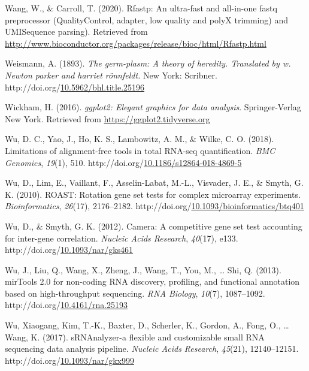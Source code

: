 \documentclass[12pt,twoside]{reedthesis}
\newlength{\cslhangindent}
\newenvironment{CSLReferences}[2] %
 {%
  \setlength{\parindent}{0pt}
  \ifodd #1 \everypar{\setlength{\hangindent}{\cslhangindent}}\ignorespaces\fi
  \ifnum #2 > 0
  \setlength{\parskip}{#2\baselineskip}
  \fi
 }%
 {}
\begin{document}
\begin{CSLReferences}{1}{0}
\leavevmode{}%
Wang, W., \& Carroll, T. (2020). Rfastp: An ultra-fast and all-in-one fastq preprocessor (QualityControl, adapter, low quality and polyX trimming) and UMISequence parsing). Retrieved from \url{http://www.bioconductor.org/packages/release/bioc/html/Rfastp.html}

\leavevmode{}%
Weismann, A. (1893). \emph{The germ-plasm: A theory of heredity. Translated by w. Newton parker and harriet rönnfeldt.} New York: Scribner. http://doi.org/\href{https://doi.org/10.5962/bhl.title.25196}{10.5962/bhl.title.25196}

\leavevmode{}%
Wickham, H. (2016). \emph{ggplot2: Elegant graphics for data analysis}. Springer-Verlag New York. Retrieved from \url{https://ggplot2.tidyverse.org}

\leavevmode{}%
Wu, D. C., Yao, J., Ho, K. S., Lambowitz, A. M., \& Wilke, C. O. (2018). Limitations of alignment-free tools in total RNA-seq quantification. \emph{BMC Genomics}, \emph{19}(1), 510. http://doi.org/\href{https://doi.org/10.1186/s12864-018-4869-5}{10.1186/s12864-018-4869-5}

\leavevmode{}%
Wu, D., Lim, E., Vaillant, F., Asselin-Labat, M.-L., Visvader, J. E., \& Smyth, G. K. (2010). ROAST: Rotation gene set tests for complex microarray experiments. \emph{Bioinformatics}, \emph{26}(17), 2176--2182. http://doi.org/\href{https://doi.org/10.1093/bioinformatics/btq401}{10.1093/bioinformatics/btq401}

\leavevmode{}%
Wu, D., \& Smyth, G. K. (2012). Camera: A competitive gene set test accounting for inter-gene correlation. \emph{Nucleic Acids Research}, \emph{40}(17), e133. http://doi.org/\href{https://doi.org/10.1093/nar/gks461}{10.1093/nar/gks461}

\leavevmode{}%
Wu, J., Liu, Q., Wang, X., Zheng, J., Wang, T., You, M., \ldots{} Shi, Q. (2013). mirTools 2.0 for non-coding RNA discovery, profiling, and functional annotation based on high-throughput sequencing. \emph{RNA Biology}, \emph{10}(7), 1087--1092. http://doi.org/\href{https://doi.org/10.4161/rna.25193}{10.4161/rna.25193}

\leavevmode{}%
Wu, Xiaogang, Kim, T.-K., Baxter, D., Scherler, K., Gordon, A., Fong, O., \ldots{} Wang, K. (2017). sRNAnalyzer-a flexible and customizable small RNA sequencing data analysis pipeline. \emph{Nucleic Acids Research}, \emph{45}(21), 12140--12151. http://doi.org/\href{https://doi.org/10.1093/nar/gkx999}{10.1093/nar/gkx999}


\end{CSLReferences}
\end{document}
